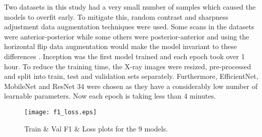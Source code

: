 \documentclass[10pt,twocolumn,letterpaper]{article}
\begin{document}
Two datasets in this study had a very small number of samples which caused the models to 
overfit early. To mitigate this, random contrast and sharpness adjustment 
\cite{nanni2021comparison} data augmentation techniques were used. Some scans in the 
datasets were anterior-posterior while some others were posterior-anterior and using the 
horizontal flip data augmentation would make the model invariant to these differences
\cite{botev2022regularising}.
Inception was the first model trained and each epoch took over 1 hour. To reduce the 
training time, the X-ray images were resized, pre-processed and split into train, test and 
validation sets separately. Furthermore, EfficientNet, MobileNet and ResNet 34 were chosen 
as they have a considerably low number of learnable parameters. Now each epoch is taking 
less than 4 minutes. 

\begin{table*}[tbh]
  \centering
  \boldmath
  \caption{F1 (higher is better), time per epoch in seconds (lower is better), and number of epochs to reach the best validation loss (lower is better) for the 12 models that were trained.}
  \label{table:conducts}
  \end{table*}
  \begin{figure}[t]
    \centering
    \texttt{[image: f1\_loss.eps]}  
     \caption{Train \& Val F1 \& Loss plots for the 9 models.}
     \label{fig:acc_loss_sep}
  \end{figure}
  
\end{document}
